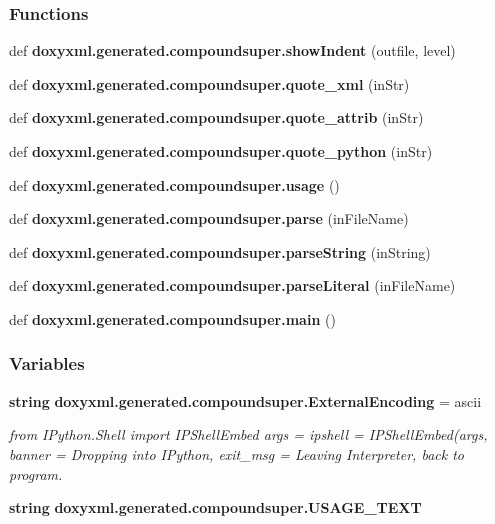 \subsubsection*{Functions}
\begin{DoxyCompactItemize}
\item 
def {\bf doxyxml.\+generated.\+compoundsuper.\+show\+Indent} (outfile, level)
\item 
def {\bf doxyxml.\+generated.\+compoundsuper.\+quote\+\_\+xml} (in\+Str)
\item 
def {\bf doxyxml.\+generated.\+compoundsuper.\+quote\+\_\+attrib} (in\+Str)
\item 
def {\bf doxyxml.\+generated.\+compoundsuper.\+quote\+\_\+python} (in\+Str)
\item 
def {\bf doxyxml.\+generated.\+compoundsuper.\+usage} ()
\item 
def {\bf doxyxml.\+generated.\+compoundsuper.\+parse} (in\+File\+Name)
\item 
def {\bf doxyxml.\+generated.\+compoundsuper.\+parse\+String} (in\+String)
\item 
def {\bf doxyxml.\+generated.\+compoundsuper.\+parse\+Literal} (in\+File\+Name)
\item 
def {\bf doxyxml.\+generated.\+compoundsuper.\+main} ()
\end{DoxyCompactItemize}
\subsubsection*{Variables}
\begin{DoxyCompactItemize}
\item 
{\bf string} {\bf doxyxml.\+generated.\+compoundsuper.\+External\+Encoding} = \textquotesingle{}ascii\textquotesingle{}
\begin{DoxyCompactList}\small\item\em from I\+Python.\+Shell import I\+P\+Shell\+Embed args = \textquotesingle{}\textquotesingle{} ipshell = I\+P\+Shell\+Embed(args, banner = \textquotesingle{}Dropping into I\+Python\textquotesingle{}, exit\+\_\+msg = \textquotesingle{}Leaving Interpreter, back to program. \end{DoxyCompactList}\item 
{\bf string} {\bf doxyxml.\+generated.\+compoundsuper.\+U\+S\+A\+G\+E\+\_\+\+T\+E\+XT}
\end{DoxyCompactItemize}

